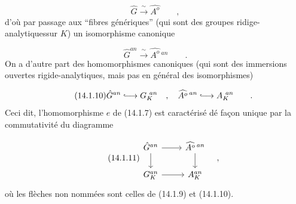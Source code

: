 \begin{equation}\tag{14.1.8}
\hat{G} \xrightarrow{\ \sim\ } \widehat{A^{o}} \qquad ,
\end{equation}
d'où par passage aux ``fibres génériques'' (qui sont des groupes ridige-analytiquessur $K$) un isomorphisme canonique

\begin{equation}\tag{14.1.9}
\hat{G}^{an} \xrightarrow{\ \sim\ } \widehat{A^{o}}\,{}^{an} \qquad .
\end{equation}
On a d'autre part des homomorphismes canoniques (qui sont des immersions ouvertes rigide-analytiques, mais pas en général des isomorphismes)

\begin{equation}\tag{14.1.10}
\hat{G}^{an} \lhook\joinrel\longrightarrow G_K^{\ an} \quad , \quad \widehat{A^{o}}\,{}^{an} \lhook\joinrel\longrightarrow A_K^{\ an} \qquad .
\end{equation}
Ceci dit, l'homomorphisme $e$ de (14.1.7) est caractérisé dé façon unique par la commutativité du diagramme

\begin{equation}\tag{14.1.11}
\begin{tikzcd}
\hat{G}^{an} \arrow[r] \arrow[d] & \widehat{A^{o}}\,{}^{an} \arrow[d] \\
G_K^{an} \arrow[r] & A_K^{an}
\end{tikzcd} \quad ,
\end{equation}
où les flèches non nommées sont celles de (14.1.9) et (14.1.10).


